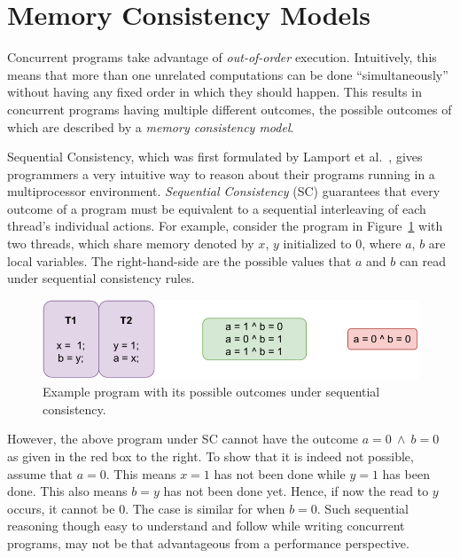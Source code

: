 \section{Memory Consistency Models}

Concurrent programs take advantage of \textit{out-of-order} execution. Intuitively, this means that more than one unrelated computations can be done ``simultaneously'' without having any fixed order in which they should happen. 
This results in concurrent programs having multiple different outcomes, the possible outcomes of which are described by
a \textit{memory consistency model}. 

Sequential Consistency, which was first formulated by Lamport et al.~\cite{Lamport79}, gives programmers a very intuitive way to reason about their programs running in a multiprocessor environment.
\textit{Sequential Consistency} (SC) guarantees that every outcome of a program must be equivalent to a sequential interleaving of each thread's individual actions. 
For example, consider the program in Figure~\ref{intro:Example} with two threads, which share memory denoted by $x$, $y$ initialized to 0, where $a$, $b$ are local variables. The right-hand-side are the possible values that $a$ and $b$ can read under sequential consistency rules.

\begin{figure}[H]
    \centering
    \includegraphics[scale=0.7]{2.Background/SC_Example1(a).pdf}
    \caption{Example program with its possible outcomes under sequential consistency.}
    \label{intro:Example}
\end{figure}

However, the above program under SC cannot have the outcome $a=0\ \wedge\ b=0$ as given in the red box to the right. To show that it is indeed not possible, assume that $a=0$. This means $x=1$ has not been done while $y=1$ has been done. This also means $b=y$ has not been done yet. Hence, if now the read to $y$ occurs, it cannot be $0$. The case is similar for when $b=0$. 
Such sequential reasoning though easy to understand and follow while writing concurrent programs, may not be that advantageous from a performance perspective.

